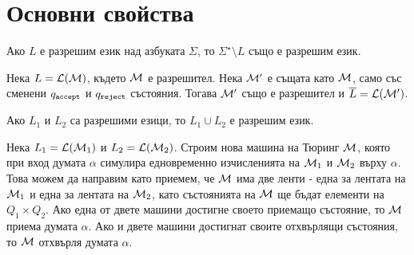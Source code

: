 \section{Основни свойства}

\begin{proposition}
  Ако $L$ е разрешим език над азбуката $\Sigma$, то $\Sigma^\star \setminus L$ също е разрешим език.
\end{proposition}
\begin{hint}
  Нека $L = \mathcal{L}(\mathcal{M})$, където $\mathcal{M}$ е разрешител.
  Нека $\mathcal{M}'$ е същата като $\mathcal{M}$, само със сменени $q_{\texttt{accept}}$ и $q_{\texttt{reject}}$ състояния.
  Тогава $\mathcal{M}'$ също е разрешител и $\overline{L} = \mathcal{L}(\mathcal{M}')$.
\end{hint}

\begin{proposition}
  Ако $L_1$ и $L_2$ са разрешими езици, то $L_1 \cup L_2$ е разрешим език.
\end{proposition}
\begin{hint}
  Нека $L_1 = \mathcal{L}(\mathcal{M}_1)$ и $L_2 = \mathcal{L}(\mathcal{M}_2)$.
  Строим нова машина на Тюринг $\mathcal{M}$, която при вход думата $\alpha$
  симулира едновременно изчисленията на $\mathcal{M}_1$ и $\mathcal{M}_2$ върху $\alpha$.
  Това можем да направим като приемем, че $\mathcal{M}$ има две ленти - една за лентата на $\mathcal{M}_1$ и една за лентата на $\mathcal{M}_2$,
  като състоянията на $\mathcal{M}$ ще бъдат елементи на $Q_1 \times Q_2$.
  Ако една от двете машини достигне своето приемащо състояние, то $\mathcal{M}$ приема думата $\alpha$.
  Ако и двете машини достигнат своите отхвърлящи състояния, то $\mathcal{M}$ отхвърля думата $\alpha$.
\end{hint}


